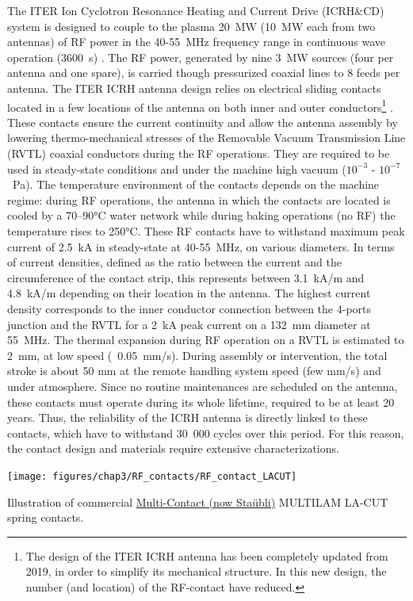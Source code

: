 {The ITER Ion Cyclotron Resonance Heating and Current Drive (ICRH\&CD) system is designed to couple to the plasma 20~MW (10~MW each from two antennas) of RF power in the 40-55~MHz frequency range in continuous wave operation (3600~s) . The RF power, generated by nine 3~MW sources (four per antenna and one spare), is carried though pressurized coaxial lines to 8 feeds per antenna. The ITER ICRH antenna design relies on electrical sliding contacts located in a few locations of the antenna on both inner and outer conductors\footnote{The design of the ITER ICRH antenna has been completely updated from 2019, in order to simplify its mechanical structure. In this new design, the number (and location) of the RF-contact have reduced.} . These contacts ensure the current continuity and allow the antenna assembly by lowering thermo-mechanical stresses of the Removable Vacuum Transmission Line (RVTL) coaxial conductors during the RF operations. They are required to be used in steady-state conditions and under the machine high vacuum ($ 10^{-3}$ - $10^{-7}$~\si{Pa}). The temperature environment of the contacts depends on the machine regime: during RF operations, the antenna in which the contacts are located is cooled by a 70–90$\si{\degreeCelsius}$ water network while during baking operations (no RF) the temperature rises to 250$\si{\degreeCelsius}$. These RF contacts have to withstand maximum peak current of 2.5~kA in steady-state at 40-55~MHz, on various diameters. In terms of current densities, defined as the ratio between the current and the circumference of the contact strip, this represents between 3.1~kA/m and 4.8~kA/m depending on their location in the antenna. The highest current density corresponds to the inner conductor connection between the 4-ports junction and the RVTL for a 2~kA peak current on a 132~mm diameter at 55~MHz. The thermal expansion during RF operation on a RVTL is estimated to 2~mm, at low speed (~0.05~mm/s). During assembly or intervention, the total stroke is about 50 mm at the remote handling system speed (few \si{mm/s}) and under atmosphere. Since no routine maintenances are scheduled on the antenna, these contacts must operate during its whole lifetime, required to be at least 20 years. Thus, the reliability of the ICRH antenna is directly linked to these contacts, which have to withstand 30~000 cycles over this period. For this reason, the contact design and materials require extensive characterizations.
\begin{marginfigure}[-9cm]
	\centering
	\texttt{[image: figures/chap3/RF\_contacts/RF\_contact\_LACUT]}
	\caption{Illustration of commercial \href{https://ec.staubli.com/products/productline/7}{Multi-Contact (now Staübli)} MULTILAM  LA-CUT spring contacts. }
	\label{fig:rfcontactlacut}
\end{marginfigure}

}
